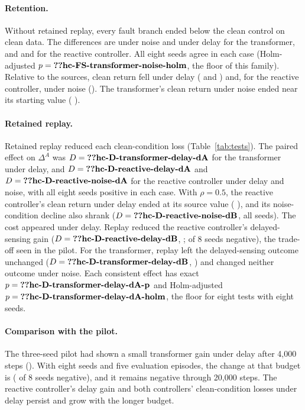 \paragraph{Retention.} Without retained replay, every fault branch ended below the clean control on clean data. The differences are  under noise and  under delay for the transformer, and  and  for the reactive controller. All eight seeds agree in each case (Holm-adjusted $p=\R{hc-FS-transformer-noise-holm}$, the floor of this family). Relative to the sources, clean return fell under delay ( and ) and, for the reactive controller, under noise (). The transformer's clean return under noise ended near its starting value ( ).

\paragraph{Retained replay.} Retained replay reduced each clean-condition loss (Table~\ref{tab:tests}). The paired effect on $\Delta^A$ was $D=\R{hc-D-transformer-delay-dA}$ for the transformer under delay, and $D=\R{hc-D-reactive-delay-dA}$ and $D=\R{hc-D-reactive-noise-dA}$ for the reactive controller under delay and noise, with all eight seeds positive in each case. With $\rho=0.5$, the reactive controller's clean return under delay ended at its source value ( ), and its noise-condition decline also shrank ($D=\R{hc-D-reactive-noise-dB}$, all seeds). The cost appeared under delay. Replay reduced the reactive controller's delayed-sensing gain ($D=\R{hc-D-reactive-delay-dB}$, ;  of 8 seeds negative), the trade-off seen in the pilot. For the transformer, replay left the delayed-sensing outcome unchanged ($D=\R{hc-D-transformer-delay-dB}$, ) and changed neither outcome under noise. Each consistent effect has exact $p=\R{hc-D-transformer-delay-dA-p}$ and Holm-adjusted $p=\R{hc-D-transformer-delay-dA-holm}$, the floor for eight tests with eight seeds.

\paragraph{Comparison with the pilot.} The three-seed pilot had shown a small transformer gain under delay after 4,000 steps (). With eight seeds and five evaluation episodes, the change at that budget is  ( of 8 seeds negative), and it remains negative through 20,000 steps. The reactive controller's delay gain and both controllers' clean-condition losses under delay persist and grow with the longer budget.

